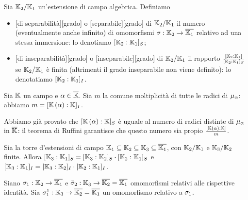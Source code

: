 \begin{Definition}
	Sia $\mathbb{K}_2/\mathbb{K}_1$ un'estensione di campo algebrica. Definiamo
	\begin{itemize}
		\item {}[di separabilit\`a][grado] o [separabile][grado] di $\mathbb{K}_2/\mathbb{K}_1$ il numero (eventualmente anche infinito) di omomorfismi $\sigma: \mathbb{K}_2 \rightarrow \overline{\mathbb{K}_1}$ relativo ad una stessa immersione: lo denotiamo $[\mathbb{K}_2:\mathbb{K}_1]_S$;
		\item {}[di inseparabilit\`a][grado] o [inseparabile][grado] di $\mathbb{K}_2/\mathbb{K}_1$ il rapporto $\frac{[\mathbb{K}_2:\mathbb{K}_1]}{[\mathbb{K}_2:\mathbb{K}_1]_S}$ se $\mathbb{K}_2/\mathbb{K}_1$ \`e finita (altrimenti il grado inseparabile non viene definito): lo denotatiamo $[\mathbb{K}_2:\mathbb{K}_1]_I$.
		\end{itemize}
\end{Definition}
\begin{Theorem}
	Sia $\mathbb{K}$ un campo e $\alpha \in \overline{\mathbb{K}}$. Sia $m$ la comune moltiplicit\`a di tutte le radici di $\MinimalPolynomial{\alpha}$: abbiamo $m = [\mathbb{K} \left ( \alpha \right ):\mathbb{K}]_I$.
\end{Theorem}
\Proof Abbiamo gi\`a provato che $[\mathbb{K} \left ( \alpha \right ):\mathbb{K}]_S$ \`e uguale al numero di radici distinte di $\MinimalPolynomial{\alpha}$ in $\overline{\mathbb{K}}$: il teorema di Ruffini garantisce che questo numero sia propio $\frac{[\mathbb{K} \left ( \alpha \right ):\mathbb{K}]}{m}$. \EndProof
\begin{Theorem}
	Sia la torre d'estensioni di campo $\mathbb{K}_1 \subseteq \mathbb{K}_2 \subseteq \mathbb{K}_3 \subseteq \overline{\mathbb{K}_1}$, con $\mathbb{K}_2/\mathbb{K}_1$ e $\mathbb{K}_3/\mathbb{K}_2$ finite. Allora $[\mathbb{K}_3:\mathbb{K}_1]_S = [\mathbb{K}_3:\mathbb{K}_2]_S \cdot [\mathbb{K}_2:\mathbb{K}_1]_S$ e $[\mathbb{K}_3:\mathbb{K}_1]_I = [\mathbb{K}_3:\mathbb{K}_2]_I \cdot [\mathbb{K}_2:\mathbb{K}_1]_I$.
\end{Theorem}
\Proof Siano $\sigma_1: \mathbb{K}_2 \rightarrow \overline{\mathbb{K}_1}$ e $\bar{\sigma}_2: \mathbb{K}_3 \rightarrow \overline{\mathbb{K}_2} = \overline{\mathbb{K}_1}$ omomorfismi relativi alle rispettive identit\`a. Sia $\sigma_1^1: \mathbb{K}_3 \rightarrow \overline{\mathbb{K}_2} = \overline{\mathbb{K}_1}$ un omomorfismo relativo a $\sigma_1$.
